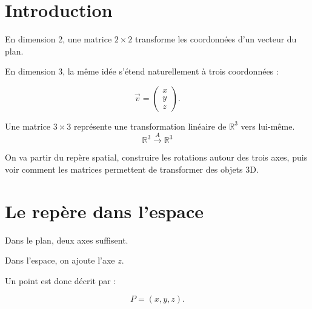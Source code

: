 \documentclass[11pt,a4paper]{article}
\newcommand{\sectiontitle}[1]{\section{#1}}
\begin{document}
\newpage


\sectiontitle{Introduction}

En dimension 2, une matrice $2\times2$ transforme les coordonnées
d'un vecteur du plan.

En dimension 3, la même idée s'étend naturellement à trois coordonnées :

\[
\vec v=
\begin{pmatrix}
 x\\
 y\\
 z
\end{pmatrix}.
\]

\begin{definitionbox}
Une matrice $3\times3$ représente une transformation linéaire
de $\mathbb{R}^3$ vers lui-même.
\[
\boxed{
\mathbb{R}^3
\xrightarrow{\;A\;}
\mathbb{R}^3
}
\]
\end{definitionbox}

On va partir du repère spatial, construire les rotations autour
des trois axes, puis voir comment les matrices permettent de
transformer des objets 3D.


\sectiontitle{Le repère dans l'espace}

Dans le plan, deux axes suffisent.

Dans l'espace, on ajoute l'axe $z$.

Un point est donc décrit par :

\[
P=(x,y,z).
\]
\end{document}
